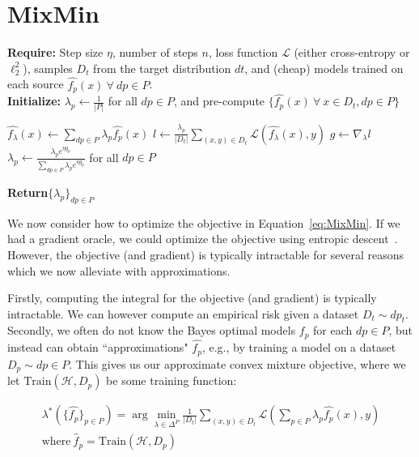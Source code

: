\section{MixMin}
\label{sec:method}

\begin{algorithm}[t]
\caption{\method}
\label{alg:mixmin}
\begin{flushleft}
\textbf{Require:} 
Step size $\eta$, number of steps $n$, loss function $\mathcal{L}$ (either cross-entropy or $\ell_2^2$), samples $D_t$ from the target distribution $dt$, and (cheap) models trained on each source $\hat{f_p}(x)~\forall~dp \in P$. 
\\
\textbf{Initialize:} $\lambda_p \gets \frac{1}{|P|}$ for all $dp \in P$, and pre-compute $\{\hat{f_p}(x)~\forall~x \in D_t, dp \in P\}$
\end{flushleft}

\begin{algorithmic}[1]
    \STATE $\hat{f_{\lambda}}(x) \gets \sum_{dp \in P} \lambda_p \hat{f_p}(x)$
    \STATE $l \gets  \frac{\lambda_p}{|D_t|} \sum_{(x,y) \in D_t} \mathcal{L}(\hat{f_{\lambda}}(x),y)$
    \STATE $g \gets \nabla_{\lambda}l$
    \STATE $\lambda_p \gets \frac{\lambda_p e^{\eta g_p}}{\sum_{dp \in P} \lambda_p e^{\eta g_p}}$ for all $dp \in P$ 
\ENDFOR

\textbf{Return}{$\{\lambda_p\}_{dp \in P}$}
\end{algorithmic}
\end{algorithm}

We now consider how to optimize the objective in Equation~\ref{eq:MixMin}. If we had a gradient oracle, we could optimize the objective using entropic descent~\citep{duchi2018introductory}. However, the objective (and gradient) is typically intractable for several reasons which we now alleviate with approximations. %


Firstly, computing the integral for the objective (and gradient) is typically intractable. We can however compute an empirical risk given a dataset $D_t \sim dp_t$. Secondly, we often do not know the Bayes optimal models $f_p$ for each $dp \in P$, but instead can obtain ``approximations" $\hat{f_p}$, e.g., by training a model on a dataset $D_p \sim dp \in P$. This gives us our approximate convex mixture objective, where we let $\text{Train}(\mathcal{H},D_p)$ be some training function:




\begin{align*}
    \label{eq:MixMin_approx}
    \lambda^*(\{\hat{f_p}\}_{p \in P})  = \arg \min_{\lambda \in \Delta^{P}}
    \frac{1}{|D_t|}\sum_{(x,y) \in D_t}  \mathcal{L}(\sum_{p \in P} \lambda_p \hat{f_p}(x),y) \\
    \text{where}~\hat{f}_p = \text{Train}(\mathcal{H},D_p)\\
    \tag{MixMin}
\end{align*}

